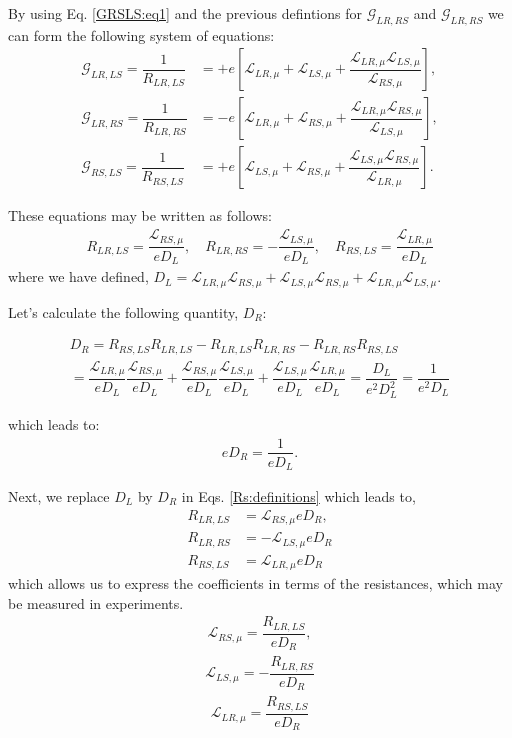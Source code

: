 By using Eq. \eqref{GRSLS:eq1} and the previous defintions for $\mathcal{G}_{LR,RS}$ and $\mathcal{G}_{LR,RS}$ we can form the following system of equations:
\begin{align*}
\mathcal{G}_{LR,LS}=\dfrac{1}{{R}_{LR,LS}}
&=
+e\left[\mathcal{L}_{LR,\mu} + \mathcal{L}_{LS,\mu} +\dfrac{\mathcal{L}_{LR,\mu} \mathcal{L}_{LS,\mu}}{\mathcal{L}_{RS,\mu}}\right],
\\
\mathcal{G}_{LR,RS}=\dfrac{1}{{R}_{LR,RS}}
&=
-e\left[\mathcal{L}_{LR,\mu}
+\mathcal{L}_{RS,\mu}+\dfrac{
\mathcal{L}_{LR,\mu} \mathcal{L}_{RS,\mu} }{\mathcal{L}_{LS,\mu}}\right],
\\
\mathcal{G}_{RS,LS}=\dfrac{1}{{R}_{RS,LS}}&=
+e\left[\mathcal{L}_{LS,\mu}+\mathcal{L}_{RS,\mu}+\dfrac{\mathcal{L}_{LS,\mu} \mathcal{L}_{RS,\mu}}{\mathcal{L}_{LR,\mu}}\right].
\end{align*}

These equations may be written as follows:
\begin{align}\label{Rs:definitions}
R_{LR,LS}
=
\dfrac{\mathcal{L}_{RS,\mu}}{eD_{L}},
\quad
R_{LR,RS}=-\dfrac{\mathcal{L}_{LS,\mu}}{eD_{L}},
\quad
R_{RS,LS}=\dfrac{\mathcal{L}_{LR,\mu}}{eD_{L}}
\end{align}
where we have defined,
$D_{L}=\mathcal{L}_{LR,\mu}\mathcal{L}_{RS,\mu} + \mathcal{L}_{LS,\mu}\mathcal{L}_{RS,\mu} +\mathcal{L}_{LR,\mu}\mathcal{L}_{LS,\mu}$.

Let's calculate the following quantity, $D_{R}$:
\begin{widetext}
\begin{multline}\label{DR:def}
D_{R}=R_{RS,LS}R_{LR,LS}
-
R_{LR,LS}R_{LR,RS}
-
R_{LR,RS}R_{RS,LS}
\\=
\dfrac{\mathcal{L}_{LR,\mu}}{eD_{L}}
\dfrac{\mathcal{L}_{RS,\mu}}{eD_{L}}
+
\dfrac{\mathcal{L}_{RS,\mu}}{eD_{L}}
\dfrac{\mathcal{L}_{LS,\mu}}{eD_{L}}
+
\dfrac{\mathcal{L}_{LS,\mu}}{eD_{L}}
\dfrac{\mathcal{L}_{LR,\mu}}{eD_{L}}
=
\dfrac{D_{L}}{e^{2}D^{2}_{L}}=\dfrac{1}{e^{2}D_{L}}
\end{multline}
\end{widetext}
which leads to:
\begin{align}\label{DR:def:2}
eD_{R}=\dfrac{1}{eD_{L}}.
\end{align}

Next, we replace $D_{L}$ by $D_{R}$ in Eqs. \eqref{Rs:definitions} which leads to,
\begin{align*}
R_{LR,LS}
&=
\mathcal{L}_{RS,\mu}eD_{R},
\\
R_{LR,RS}
&=-\mathcal{L}_{LS,\mu}eD_{R}
\\
R_{RS,LS}
&=\mathcal{L}_{LR,\mu}eD_{R}
\end{align*}
which allows us to express the coefficients in terms of the resistances, which may be measured in experiments. 
\begin{align}\label{LRS:exp}
\mathcal{L}_{RS,\mu}=\dfrac{R_{LR,LS}}{eD_{R}},
\end{align}
\begin{align}\label{LLS:exp}
\mathcal{L}_{LS,\mu}=-\dfrac{R_{LR,RS}}{eD_{R}}
\end{align}
\begin{align}\label{LLR:exp}
\mathcal{L}_{LR,\mu}=\dfrac{R_{RS,LS}}{eD_{R}}
\end{align}
\clearpage